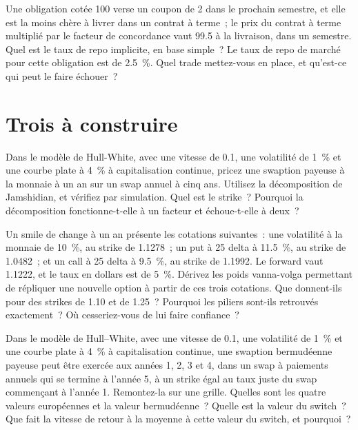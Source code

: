 \begin{question}\label{iq:iv2:rates-and-fx:47}
Une obligation cotée 100 verse un coupon de 2 dans le prochain semestre, et elle est la moins chère à livrer dans un contrat à terme~; le prix du contrat à terme multiplié par le facteur de concordance vaut 99.5 à la livraison, dans un semestre. Quel est le taux de repo implicite, en base simple~? Le taux de repo de marché pour cette obligation est de 2.5~\%. Quel trade mettez-vous en place, et qu'est-ce qui peut le faire échouer~?
\end{question}

\section{Trois à construire}

\begin{question}\label{iq:iv2:rates-and-fx:48}
Dans le modèle de Hull-White, avec une vitesse de 0.1, une volatilité de 1~\% et une courbe plate à 4~\% à capitalisation continue, pricez une swaption payeuse à la monnaie à un an sur un swap annuel à cinq ans. Utilisez la décomposition de Jamshidian, et vérifiez par simulation. Quel est le strike~? Pourquoi la décomposition fonctionne-t-elle à un facteur et échoue-t-elle à deux~?
\end{question}

\begin{question}\label{iq:iv2:rates-and-fx:49}
Un smile de change à un an présente les cotations suivantes~: une volatilité à la monnaie de 10~\%, au strike de 1.1278~; un put à 25 delta à 11.5~\%, au strike de 1.0482~; et un call à 25 delta à 9.5~\%, au strike de 1.1992. Le forward vaut 1.1222, et le taux en dollars est de 5~\%. Dérivez les poids vanna-volga permettant de répliquer une nouvelle option à partir de ces trois cotations. Que donnent-ils pour des strikes de 1.10 et de 1.25~? Pourquoi les piliers sont-ils retrouvés exactement~? Où cesseriez-vous de lui faire confiance~?
\end{question}

\begin{question}\label{iq:iv2:rates-and-fx:50}
Dans le modèle de Hull--White, avec une vitesse de 0.1, une volatilité de 1~\% et une courbe plate à 4~\% à capitalisation continue, une swaption bermudéenne payeuse peut être exercée aux années 1, 2, 3 et 4, dans un swap à paiements annuels qui se termine à l'année 5, à un strike égal au taux juste du swap commençant à l'année 1. Remontez-la sur une grille. Quelles sont les quatre valeurs européennes et la valeur bermudéenne~? Quelle est la valeur du switch~? Que fait la vitesse de retour à la moyenne à cette valeur du switch, et pourquoi~?
\end{question}
